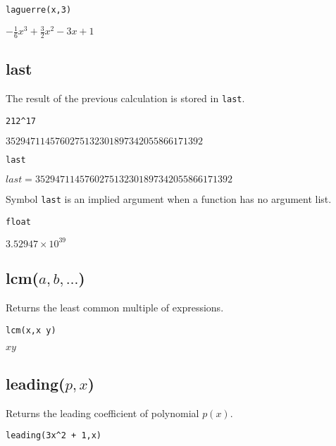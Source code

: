 {\color{blue}
\begin{verbatim}
laguerre(x,3)
\end{verbatim}
}

\noindent
$\displaystyle -\tfrac{1}{6}x^3+\tfrac{3}{2}x^2-3x+1$

\subsection*{last}

The result of the previous calculation is stored in {\tt last}.

{\color{blue}
\begin{verbatim}
212^17
\end{verbatim}
}

\noindent
$3529471145760275132301897342055866171392$

{\color{blue}
\begin{verbatim}
last
\end{verbatim}
}

\noindent
$last=3529471145760275132301897342055866171392$

\bigskip
\noindent
Symbol {\tt last} is an implied argument when a function has no argument list.

{\color{blue}
\begin{verbatim}
float
\end{verbatim}
}

\noindent
$\displaystyle 3.52947\times10^{39}$

\subsection*{lcm($a,b,\ldots$)}

Returns the least common multiple of expressions.

{\color{blue}
\begin{verbatim}
lcm(x,x y)
\end{verbatim}
}

\noindent
$xy$

\subsection*{leading($p,x$)}

Returns the leading coefficient of polynomial $p(x)$.

{\color{blue}
\begin{verbatim}
leading(3x^2 + 1,x)
\end{verbatim}
}

